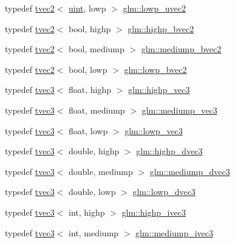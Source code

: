 \begin{DoxyCompactItemize}
\item 
typedef \hyperlink{structglm_1_1tvec2}{tvec2}$<$ \hyperlink{group__core__precision_ga4fd29415871152bfb5abd588334147c8}{uint}, lowp $>$ \hyperlink{group__core__precision_ga0eec567054355374c84c7971a07d274c}{glm\+::lowp\+\_\+uvec2}
\item 
typedef \hyperlink{structglm_1_1tvec2}{tvec2}$<$ bool, highp $>$ \hyperlink{group__core__precision_gaf76ced5823e8aace6bd257fac6c250cb}{glm\+::highp\+\_\+bvec2}
\item 
typedef \hyperlink{structglm_1_1tvec2}{tvec2}$<$ bool, mediump $>$ \hyperlink{group__core__precision_gaf46a55555e71730f77b5c885d20ae8e2}{glm\+::mediump\+\_\+bvec2}
\item 
typedef \hyperlink{structglm_1_1tvec2}{tvec2}$<$ bool, lowp $>$ \hyperlink{group__core__precision_gaf17553233b30d9ed413e822847c4ea8f}{glm\+::lowp\+\_\+bvec2}
\item 
typedef \hyperlink{structglm_1_1tvec3}{tvec3}$<$ float, highp $>$ \hyperlink{group__core__precision_ga1ef07d2502ea09b1e63998813a3d4330}{glm\+::highp\+\_\+vec3}
\item 
typedef \hyperlink{structglm_1_1tvec3}{tvec3}$<$ float, mediump $>$ \hyperlink{group__core__precision_gac76bf24aca62ca13269d262121d04ceb}{glm\+::mediump\+\_\+vec3}
\item 
typedef \hyperlink{structglm_1_1tvec3}{tvec3}$<$ float, lowp $>$ \hyperlink{group__core__precision_ga0229a1c4abd7c51f15eeb7a0fec3846b}{glm\+::lowp\+\_\+vec3}
\item 
typedef \hyperlink{structglm_1_1tvec3}{tvec3}$<$ double, highp $>$ \hyperlink{group__core__precision_ga54e097f7cd1f1cd46cc47eec67218bd3}{glm\+::highp\+\_\+dvec3}
\item 
typedef \hyperlink{structglm_1_1tvec3}{tvec3}$<$ double, mediump $>$ \hyperlink{group__core__precision_ga4f6942e5a5c9f5dc5a0e1eed980d2ecd}{glm\+::mediump\+\_\+dvec3}
\item 
typedef \hyperlink{structglm_1_1tvec3}{tvec3}$<$ double, lowp $>$ \hyperlink{group__core__precision_ga88d318815a9af448bddcb16fceb155c5}{glm\+::lowp\+\_\+dvec3}
\item 
typedef \hyperlink{structglm_1_1tvec3}{tvec3}$<$ int, highp $>$ \hyperlink{group__core__precision_gaef51de6bc442bfce2602dc301708720a}{glm\+::highp\+\_\+ivec3}
\item 
typedef \hyperlink{structglm_1_1tvec3}{tvec3}$<$ int, mediump $>$ \hyperlink{group__core__precision_ga16a38c6077c2e83375ee258cd95e224b}{glm\+::mediump\+\_\+ivec3}
\item 

\end{DoxyCompactItemize}
